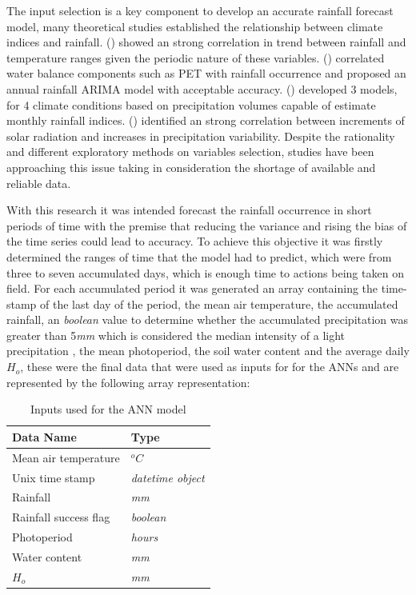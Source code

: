 The input selection is a key component to develop an accurate rainfall forecast model, many theoretical studies established the relationship between climate indices and rainfall.\citeauthor{tularam2010time} (\citeyear{tularam2010time}) showed an strong correlation in trend between rainfall and temperature ranges given the periodic nature of these variables.  \citeauthor{feng2016trend} (\citeyear{feng2016trend}) correlated water balance components such as PET with rainfall occurrence and proposed an annual rainfall ARIMA model with acceptable accuracy. \citeauthor{valipour2016much} (\citeyear{valipour2016much}) developed 3 models, for 4 climate conditions based on precipitation volumes capable of estimate monthly rainfall indices. \citeauthor{medvigy2012trends} (\citeyear{medvigy2012trends}) identified an strong correlation between increments of solar radiation and increases in precipitation variability. Despite the rationality and different exploratory methods on variables selection, studies have been approaching this issue taking in consideration the shortage of available and reliable data.

With this research it was intended forecast the rainfall occurrence in short periods of time with the premise that reducing the variance and rising the bias of the time series could lead to accuracy. To achieve this objective it was firstly determined the ranges of time that the model had to predict, which were from three to seven accumulated days, which is enough time to actions being taken on field. For each accumulated period it was generated an array containing the time-stamp of the last day of the period, the mean air temperature, the accumulated rainfall, an \textit{boolean} value to determine whether the accumulated precipitation was greater than 5\textit {mm} which is considered the median intensity of a light precipitation \cite{sun2006often}, the mean photoperiod, the soil water content and the average daily $H_o$, these were the final data that were used as inputs for for the ANNs and are represented by the following array representation:

\begin{table}[h]
 \caption{Inputs used for the ANN model}
\label{tab:netinputs}
\begin{center}
\begin{tabular}{ll}\hline
Data Name & Type\\\hline
Mean air temperature & $^oC$\\
Unix time stamp & \textit{datetime object}\\
Rainfall & \textit{mm}\\
Rainfall success flag & \textit{boolean}\\
Photoperiod & \textit{hours}\\
Water content & \textit{mm}\\
$H_o$ & \textit{mm}\\
\hline
\end{tabular}
\end{center}
\end{table}

